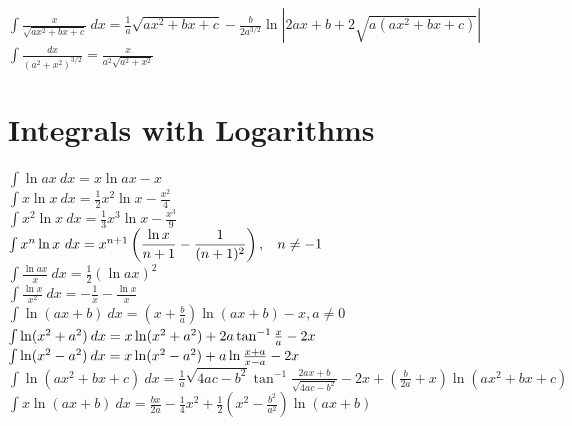\documentclass[10pt,letterpaper,landscape]{cheatsheet}
\begin{document}
$
\int \frac{x}{\sqrt{ax^2+bx+c}}\ dx=
\frac{1}{a}\sqrt{ax^2+bx + c} 
-
\frac{b}{2a^{3/2}}\ln \left| 2ax+b + 2 \sqrt{a(ax^2+bx+c)} \right|
$\\

$
\int\frac{dx}{(a^2+x^2)^{3/2}}=\frac{x}{a^2\sqrt{a^2+x^2}}
$\\



\section*{Integrals with Logarithms}

$
\int \ln ax\  dx = x \ln ax - x 
$\\

$
\int x \ln x \ dx = \frac{1}{2} x^2 \ln x-\frac{x^2}{4}
$\\

$
\int x^2 \ln x \ dx = \frac{1}{3} x^3 \ln x-\frac{x^3}{9}
$\\

$
\int x^n \ln x\ dx = x^{n+1}\left( \dfrac{\ln x}{n+1}-\dfrac{1}{(n+1)^2}\right),\hspace{2ex} n\neq -1
$\\


$
\int \frac{\ln ax}{x}\ dx = \frac{1}{2}\left( \ln ax \right)^2 
$\\

$
\int \frac{\ln x}{x^2}\ dx = -\frac{1}{x}-\frac{\ln x}{x}
$\\

$
\int \ln (ax + b) \ dx = \left( x + \frac{b}{a} \right) \ln (ax+b) - x , a\ne 0
$\\

$
\int \ln  ( x^2 + a^2 )\hspace{.5ex} {dx} = x \ln (x^2 + a^2  ) +2a\tan^{-1} \frac{x}{a} - 2x 
$\\

$
\int \ln  ( x^2 - a^2 )\hspace{.5ex} {dx} = x \ln (x^2 - a^2  ) +a\ln \frac{x+a}{x-a} - 2x 
$\\

$
\int \ln \left( ax^2 + bx + c\right) \ dx  = \frac{1}{a}\sqrt{4ac-b^2}\tan^{-1}\frac{2ax+b}{\sqrt{4ac-b^2}}
-2x + \left( \frac{b}{2a}+x \right)\ln \left(ax^2+bx+c \right) 
$\\

$
\int x \ln (ax + b)\ dx = \frac{bx}{2a}-\frac{1}{4}x^2 
+\frac{1}{2}\left(x^2-\frac{b^2}{a^2}\right)\ln (ax+b) 
$\\
\end{document}

